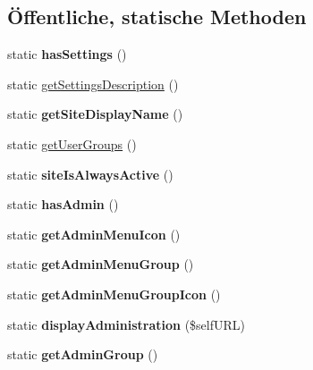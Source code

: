 \subsection*{Öffentliche, statische Methoden}
\begin{DoxyCompactItemize}
\item 
\mbox{\label{classupdatevplan_a5c955fbeb6783d718140fe8ee7ef8b4a}} 
static {\bfseries has\+Settings} ()
\item 
static \mbox{\hyperlink{classupdatevplan_a43077a61ec1f3283f898e63baf0853cd}{get\+Settings\+Description}} ()
\item 
\mbox{\label{classupdatevplan_a169af4069cdbaad762b6b3c28a50f593}} 
static {\bfseries get\+Site\+Display\+Name} ()
\item 
static \mbox{\hyperlink{classupdatevplan_a45d93d2df17784033ec72a19546ccaac}{get\+User\+Groups}} ()
\item 
\mbox{\label{classupdatevplan_a9f5728ec03226a4b4f5291f5cd981b52}} 
static {\bfseries site\+Is\+Always\+Active} ()
\item 
\mbox{\label{classupdatevplan_a6ea652952c933ce5df456140944a9b00}} 
static {\bfseries has\+Admin} ()
\item 
\mbox{\label{classupdatevplan_adb71e6064c5d27e2bddf17ac65d21475}} 
static {\bfseries get\+Admin\+Menu\+Icon} ()
\item 
\mbox{\label{classupdatevplan_a46af413816005f7aa1cd8630ad7a700b}} 
static {\bfseries get\+Admin\+Menu\+Group} ()
\item 
\mbox{\label{classupdatevplan_a1c9dc5b8be68d52f874fdbd82f147573}} 
static {\bfseries get\+Admin\+Menu\+Group\+Icon} ()
\item 
\mbox{\label{classupdatevplan_aebc26615170a58aa38e5e29f8ba37ff2}} 
static {\bfseries display\+Administration} (\$self\+U\+RL)
\item 
\mbox{\label{classupdatevplan_ae6fe7f22ce95b8de8ce2c0eba8b47e62}} 
static {\bfseries get\+Admin\+Group} ()
\item 

\end{DoxyCompactItemize}
